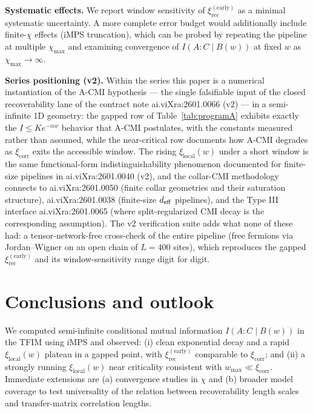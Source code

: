 \documentclass[11pt]{article}
\begin{document}
\textbf{Systematic effects.} We report window sensitivity of
$\xi_{\mathrm{rec}}^{(\mathrm{early})}$ as a minimal systematic
uncertainty. A more complete error budget would additionally include
finite-$\chi$ effects (iMPS truncation), which can be probed by
repeating the pipeline at multiple $\chi_{\max}$ and examining
convergence of $I(A : C \mid B(w))$ at fixed $w$ as $\chi_{\max} \to
\infty$.

\textbf{Series positioning (v2).} Within the series this paper is a
numerical instantiation of the A-CMI hypothesis --- the single
falsifiable input of the closed recoverability lane of the contract note
ai.viXra:2601.0066 (v2) --- in a semi-infinite 1D geometry: the gapped
row of Table~\ref{tab:programA} exhibits exactly the $I \le K
e^{-\alpha w}$ behavior that A-CMI postulates, with the constants
measured rather than assumed, while the near-critical row documents how
A-CMI degrades as $\xi_{\mathrm{corr}}$ exits the accessible window.
The rising $\xi_{\mathrm{local}}(w)$ under a short window is the same
functional-form indistinguishability phenomenon documented for
finite-size pipelines in ai.viXra:2601.0040 (v2), and the collar-CMI
methodology connects to ai.viXra:2601.0050 (finite collar geometries and
their saturation structure), ai.viXra:2601.0038 (finite-size $d_{\rm
eff}$ pipelines), and the Type III interface ai.viXra:2601.0065 (where
split-regularized CMI decay is the corresponding assumption). The v2
verification suite adds what none of these had: a tensor-network-free
cross-check of the entire pipeline (free fermions via Jordan--Wigner on
an open chain of $L = 400$ sites), which reproduces the gapped
$\xi_{\mathrm{rec}}^{(\mathrm{early})}$ and its window-sensitivity range
digit for digit.

\section{Conclusions and outlook}

We computed semi-infinite conditional mutual information $I(A : C \mid
B(w))$ in the TFIM using iMPS and observed: (i) clean exponential decay
and a rapid $\xi_{\mathrm{local}}(w)$ plateau in a gapped point, with
$\xi_{\mathrm{rec}}^{(\mathrm{early})}$ comparable to
$\xi_{\mathrm{corr}}$; and (ii) a strongly running
$\xi_{\mathrm{local}}(w)$ near criticality consistent with $w_{\max} \ll
\xi_{\mathrm{corr}}$. Immediate extensions are (a) convergence studies
in $\chi$ and (b) broader model coverage to test universality of the
relation between recoverability length scales and transfer-matrix
correlation lengths.
\end{document}
